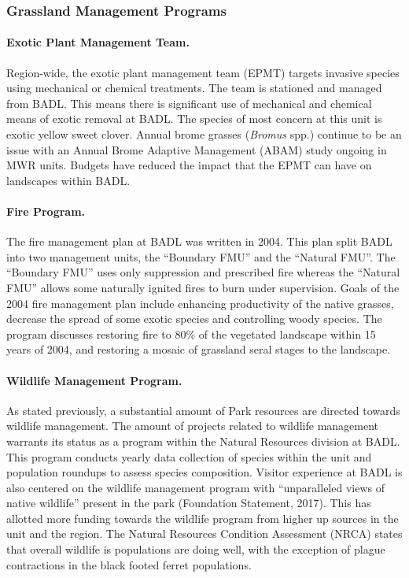 \subsubsection{Grassland Management Programs}

\paragraph{Exotic Plant Management Team.} Region-wide, the exotic plant management team (EPMT) targets invasive species using mechanical or chemical treatments. 
The team is stationed and managed from BADL.
This means there is significant use of mechanical and chemical means of exotic removal at BADL. 
The species of most concern at this unit is exotic yellow sweet clover. 
Annual brome grasses (\emph{Bromus} spp.) continue to be an issue with an Annual Brome Adaptive Management (ABAM) study ongoing in MWR units.
Budgets have reduced the impact that the EPMT can have on landscapes within BADL.

\paragraph{Fire Program.} The fire management plan at BADL was written in 2004. 
This plan split BADL into two management units, the ``Boundary FMU'' and the ``Natural FMU''. 
The ``Boundary FMU'' uses only suppression and prescribed fire whereas the ``Natural FMU'' allows some naturally ignited fires to burn under supervision.
Goals of the 2004 fire management plan include enhancing productivity of the native grasses, decrease the spread of some exotic species and controlling woody species. 
The program discusses restoring fire to 80\% of the vegetated landscape within 15 years of 2004, and restoring a mosaic of grassland seral stages to the landscape.

\paragraph{Wildlife Management Program.} As stated previously, a substantial amount of Park resources are directed towards wildlife management. 
The amount of projects related to wildlife management warrants its status as a program within the Natural Resources division at BADL. 
This program conducts yearly data collection of species within the unit and population roundups to assess species composition. 
Visitor experience at BADL is also centered on the wildlife management program with ``unparalleled views of native wildlife'' present in the park (Foundation Statement, 2017). 
This has allotted more funding towards the wildlife program from higher up sources in the unit and the region. 
The Natural Resources Condition Assessment (NRCA) states that overall wildlife is populations are doing well, with the exception of plague contractions in the black footed ferret populations.

